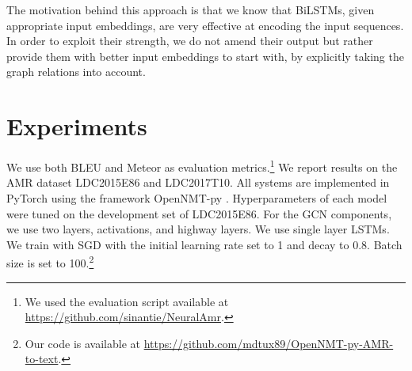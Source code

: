 \documentclass[11pt,a4paper]{article}
\begin{document}
The motivation behind this approach is that we know that BiLSTMs, given appropriate input embeddings, are very effective at encoding the input sequences. In order to exploit their strength, we do not amend their output but rather provide them with better input embeddings to start with, by explicitly taking the graph relations into account. 






\section{Experiments}
\label{sec:experiments}

We use both BLEU \cite{papineni2002bleu} and Meteor \cite{banerjee2005meteor} as evaluation metrics.\footnote{We used the evaluation script available at \url{https://github.com/sinantie/NeuralAmr}.} We report results on the AMR dataset LDC2015E86 and LDC2017T10.
All systems are implemented in PyTorch \cite{paszke2017automatic} using the framework OpenNMT-py \cite{opennmt}.
Hyperparameters of each model were tuned on the development set of LDC2015E86. For the GCN components, we use two layers,  activations, and  highway layers. We use single layer LSTMs. We train with SGD with the initial learning rate set to 1 and decay to 0.8. Batch size is set to 100.\footnote{Our code is available at \url{https://github.com/mdtux89/OpenNMT-py-AMR-to-text}.} 
\end{document}
